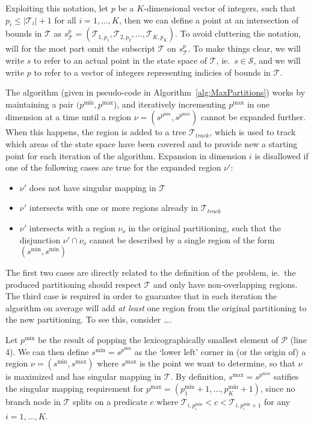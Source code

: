 Exploiting this notation, let $p$ be a $K$-dimensional vector of integers, such
that $p_i \leq |\mathcal{T}_i| + 1$ for all $i = 1,\ldots,K$, then we can define
a point at an intersection of bounds in $\mathcal{T}$ as $s^{p}_{\mathcal{T}} =
(\mathcal{T}_{1,p_1}, \mathcal{T}_{2,p_2}, \ldots, \mathcal{T}_{K,p_K})$. To
avoid cluttering the notation, will for the most part omit the subscript
$\mathcal{T}$ on $s^{p}_{\mathcal{T}}$. To make things clear, we will write $s$
to refer to an actual point in the state space of $\mathcal{T}$, ie.\ $s \in
\mathcal{S}$, and we will write $p$ to refer to a vector of integers
representing indicies of bounds in $\mathcal{T}$.

The algorithm (given in pseudo-code in Algorithm~\ref{alg:MaxPartitions}) works
by maintaining a pair $(p^{\min}, p^{\max}$), and iteratively incrementing
$p^{\max}$ in one dimension at a time until a region $\nu = (s^{p^{\min}},
s^{p^{\max}})$ cannot be expanded further. When this happens, the region is
added to a tree $\mathcal{T}_{track}$, which is used to track which areas of the
state space have been covered and to provide new a starting point for each
iteration of the algorithm. Expansion in dimension $i$ is disallowed if one of
the following cases are true for the expanded region $\nu'$:

\begin{itemize}
    \item $\nu'$ does not have singular mapping in $\mathcal{T}$
    \item $\nu'$ intersects with one or more regions already in
        $\mathcal{T}_{track}$
    \item $\nu'$ intersects with a region $\nu_{o}$ in the original
        partitioning, such that the disjunction $\nu' \cap \nu_{o}$ cannot be
        described by a single region of the form $(s^{\min}, s^{\min})$
\end{itemize}

\noindent The first two cases are directly related to the definition of the
problem, ie.\ the produced partitioning should respect $\mathcal{T}$ and only
have non-overlapping regions. The third case is required in order to guarantee
that in each iteration the algorithm on average will add \textit{at least} one
region from the original partitioning to the new partitioning. To see this,
consider \ldots{}.


Let $p^{\min}$ be the result of popping the lexicographically smallest element
of $\mathcal{P}$ (line 4). We can then define $s^{\min} = s^{p^{\min}}$ as the
`lower left' corner in (or the origin of) a region $\nu = (s^{\min}, s^{\max})$
where $s^{\max}$ is the point we want to determine, so that $\nu$ is maximized
and has singular mapping in $\mathcal{T}$. By definition, $s^{\max} =
s^{p^{\max}}$ satifies the singular mapping requirement for $p^{\max} =
(p^{\min}_{1} + 1, \ldots, p^{\min}_{K} + 1)$, since no branch node in
$\mathcal{T}$ splits on a predicate $c$ where $\mathcal{T}_{i,p^{\min}_{i}} < c
< \mathcal{T}_{i,p^{\min}_{i} + 1}$ for any $i = 1, \ldots, K$. 

